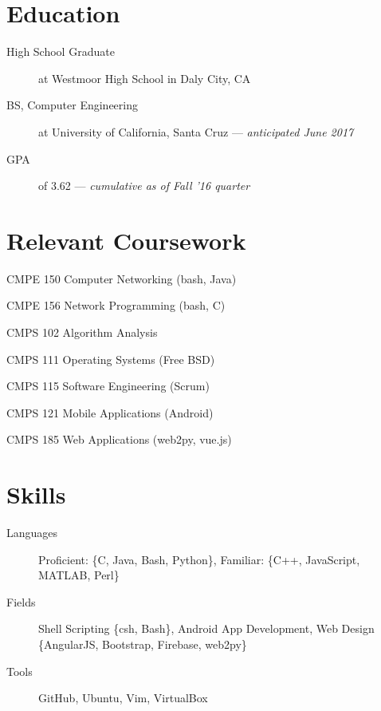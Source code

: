 \documentclass[11pt]{article}
\author{August Valera}
\begin{document}

\section*{Education}
\begin{description}
  \item[High School Graduate] at Westmoor High School in Daly City, CA
  \item[BS, Computer Engineering] at University of California,
    Santa Cruz --- \textit{anticipated June 2017}
  \item[GPA] of 3.62 --- \textit{cumulative as of Fall '16 quarter}
\end{description}

\section*{Relevant Coursework}
\begin{description}
    \begin{multicols}{2}
    \item[CMPE 150] Computer Networking (bash, Java)
    \item[CMPE 156] Network Programming (bash, C)
    \item[CMPS 102] Algorithm Analysis
    \item[CMPS 111] Operating Systems (Free BSD)
    \item[CMPS 115] Software Engineering (Scrum)
    \item[CMPS 121] Mobile Applications (Android)
    \item[CMPS 185] Web Applications (web2py, vue.js)
    \end{multicols}
\end{description}

\section*{Skills}
\begin{description}
  \item[Languages] Proficient: \{C, Java, Bash, Python\},
    Familiar: \{C++, JavaScript, MATLAB, Perl\}
  \item[Fields] Shell Scripting \{csh, Bash\}, Android App Development, Web
    Design \{AngularJS, Bootstrap, Firebase, web2py\}
  \item[Tools] GitHub, Ubuntu, Vim, VirtualBox
\end{description}
\end{document}
